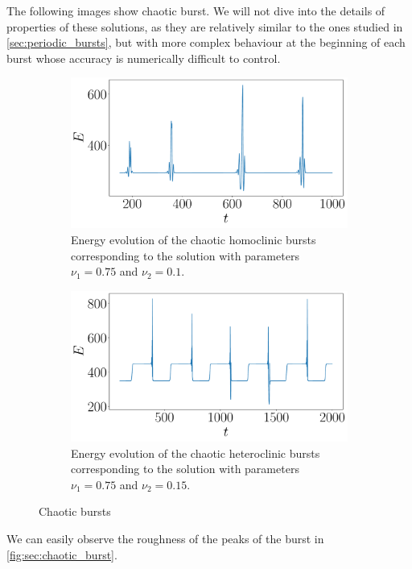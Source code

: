 \documentclass[twoside]{article}
\begin{document}
The following images show chaotic burst. We will not dive into the details of properties of these solutions, as they are relatively similar to the ones studied in \cref{sec:periodic_bursts}, but with more complex behaviour at the beginning of each burst whose accuracy is numerically difficult to control.

\begin{figure}[ht]
  \centering
  \begin{subfigure}[ht]{0.45\textwidth}
    \includegraphics[width=\textwidth]{images/homo_chaotic.pdf}
    \caption{Energy evolution of the chaotic homoclinic bursts corresponding to the solution with parameters $\nu_1=0.75$ and $\nu_2=0.1$.}
  \end{subfigure}\hfill
  \begin{subfigure}[ht]{0.45\textwidth}
    \includegraphics[width=\textwidth]{images/hetero_chaotic.pdf}
    \caption{Energy evolution of the chaotic heteroclinic bursts corresponding to the solution with parameters $\nu_1=0.75$ and $\nu_2=0.15$.}
  \end{subfigure}
  \caption{Chaotic bursts}
  \label{fig:chaotic_burst}
\end{figure}
We can easily observe the roughness of the peaks of the burst in \cref{fig:sec:chaotic_burst}.
\end{document}
